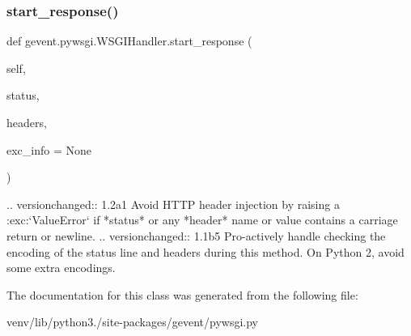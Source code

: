 \subsubsection{\texorpdfstring{start\+\_\+response()}{start\_response()}}
{\footnotesize\ttfamily def gevent.\+pywsgi.\+W\+S\+G\+I\+Handler.\+start\+\_\+response (\begin{DoxyParamCaption}\item[{}]{self,  }\item[{}]{status,  }\item[{}]{headers,  }\item[{}]{exc\+\_\+info = {\ttfamily None} }\end{DoxyParamCaption})}

\begin{DoxyVerb} .. versionchanged:: 1.2a1
    Avoid HTTP header injection by raising a :exc:`ValueError`
    if *status* or any *header* name or value contains a carriage
    return or newline.
 .. versionchanged:: 1.1b5
    Pro-actively handle checking the encoding of the status line
    and headers during this method. On Python 2, avoid some
    extra encodings.
\end{DoxyVerb}
 

The documentation for this class was generated from the following file\+:\begin{DoxyCompactItemize}
\item 
venv/lib/python3./site-\/packages/gevent/pywsgi.\+py\end{DoxyCompactItemize}

